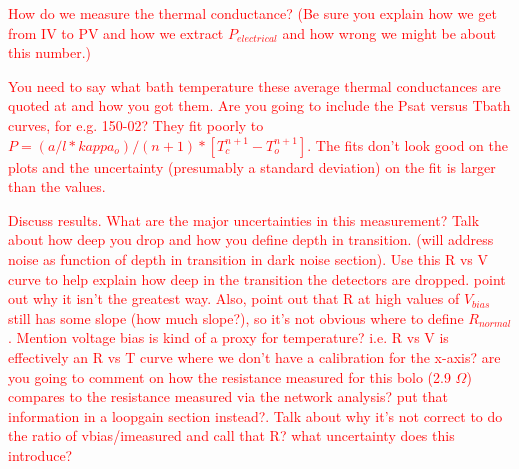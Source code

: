 






\textcolor{red}{How do we measure the thermal conductance? (Be sure you explain how we get from IV to PV and how we extract $P_{electrical}$ and how wrong we might be about this number.)}

\textcolor{red}{You need to say what bath temperature these average thermal conductances are quoted at and how you got them.}
\textcolor{red}{Are you going to include the Psat versus Tbath curves, for e.g. 150-02? They fit poorly to  $P = (a/l*kappa_{o})/(n+1)*[T_{c}^{n+1} - T_{o}^{n+1}]$. The fits don't look good on the plots and the uncertainty (presumably a standard deviation) on the fit is larger than the values.}

\textcolor{red}{Discuss results. What are the major uncertainties in this measurement? Talk about how deep you drop and how you define depth in transition. (will address noise as function of depth in transition in dark noise section).}
\textcolor{red}{Use this R vs V curve to help explain how deep in the transition the detectors are dropped. point out why it isn't the greatest way. Also, point out that R at high values of $V_{bias}$ still has some slope (how much slope?), so it's not obvious where to define $R_{normal}$. }
\textcolor{red}{Mention voltage bias is kind of a proxy for temperature? i.e. R vs V is effectively an R vs T curve where we don't have a calibration for the x-axis?}
\textcolor{red}{are you going to comment on how the resistance measured for this bolo (2.9 $\Omega$) compares to the resistance measured via the network analysis? put that information in a loopgain section instead?.}
\textcolor{red}{Talk about why it's not correct to do the ratio of vbias/imeasured and call that R? what uncertainty does this introduce?}

